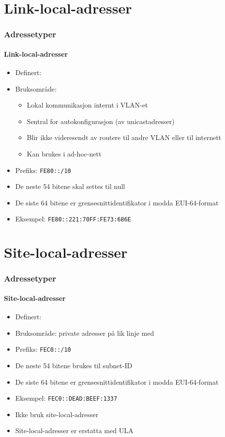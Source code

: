 \section{Link-local-adresser}
\begin{frame}%
  \frametitle{Adressetyper}
  \framesubtitle{Link-local-adresser}
  \pause
  \begin{itemize}[<+->]
  \item Definert: 
  \item Bruksområde:
    \begin{itemize}[<+->]
    \item Lokal kommunikasjon internt i VLAN-et
    \item Sentral for autokonfigurasjon (av unicastadresser)
    \item Blir ikke videresendt av routere til andre VLAN eller til internett
    \item Kan brukes i ad-hoc-nett
    \end{itemize}
  \item Prefiks: \texttt{FE80::/10}
  \item De neste 54 bitene skal settes til null
  \item De siste 64 bitene er grensesnittidentifikator i modda
    EUI-64-format
  \item Eksempel: \texttt{FE80::221:70FF:FE73:686E}
  \end{itemize}
\end{frame}

\section{Site-local-adresser}
\begin{frame}%
  \frametitle{Adressetyper}
  \framesubtitle{Site-local-adresser}
  \pause
  \begin{itemize}[<+->]
  \item Definert: 
  \item Bruksområde: private adresser på lik linje med 
  \item Prefiks: \texttt{FEC0::/10}
  \item De neste 54 bitene brukes til subnet-ID
  \item De siste 64 bitene er grensesnittidentifikator i modda
    EUI-64-format
  \item Eksempel: \texttt{FEC0::DEAD:BEEF:1337}
  \item Ikke bruk site-local-adresser 
  \item Site-local-adresser er erstatta med ULA 
  \end{itemize}
\end{frame}


